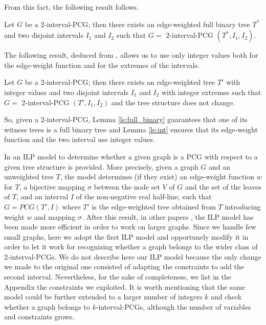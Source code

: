 \documentclass{fundam}
\newcommand{\Int}[1]{$#1$\textnormal{-interval-PCG}}
\begin{document}
\noindent
From this fact, the following result follows.

\begin{lemma}
\label{le:full_binary}
Let $G$ be a \Int{2}; then there exists an edge-weighted full binary tree $T^*$ and two disjoint intervals $I_1$ and $I_2$ such that $G=$ \Int{2} $(T^*, I_1, I_2)$.
\end{lemma}

The following result, deduced from \cite{CMPS13}, allows us to use only integer values both for the edge-weight function and for the extremes of the intervals.

\begin{lemma}
\label{le:int}
Let $G$ be a \Int{2}; then there exists an edge-weighted tree $T'$ with integer values and two disjoint intervals $I_1$ and $I_2$ with integer extremes such that $G=$ \Int{2} $(T', I_1, I_2)$ and the tree structure does not change.
\end{lemma}

So, given a \Int{2}, Lemma \ref{le:full_binary} guarantees that one of its witness trees is a full binary tree and Lemma \ref{le:int} ensures that its edge-weight function and the two interval use integer values.



\smallskip

In \cite{Calamoneri2013} an ILP model to determine whether a given graph is a PCG with respect to a given tree structure is provided.
More precisely, given a graph $G$ and an unweighted tree $T$, the model determines (if they exist) an edge-weight function $w$ for $T$,
 a bijective mapping $\sigma$ between the node set $V$ of $G$ and the set  of the leaves of $T$, and an interval $I$ of the non-negative real half-line, such that $G=PCG(T', I)$ where $T'$ is the edge-weighted tree obtained from $T$ introducing weight $w$ and mapping $\sigma$.
After this result, in other papers \cite{Azam2021,Azam2021-9}, the ILP model has been made more efficient in order to work on larger graphs.
Since we handle few small graphs, here we adopt the first ILP model and opportunely modify it in order to let it work for recognizing whether a graph belongs to the wider class of \Int{2}s.
We do not describe here our ILP model because the only change we made to the original one consisted of adapting the constraints to add the second interval.
Nevertheless, for the sake of completeness, we list in the Appendix the constraints we exploited.
It is worth mentioning that the same model could be further extended to a larger number of integers $k$ and check whether a graph belongs to \Int{k}s, although the number of variables and constraints grows.
\end{document}
